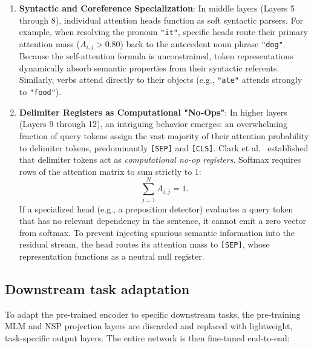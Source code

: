 \documentclass[../../../main.tex]{subfiles}
\begin{document}
\begin{enumerate}
    \item \textbf{Syntactic and Coreference Specialization}: In middle layers (Layers 5 through 8), individual attention heads function as soft syntactic parsers. For example, when resolving the pronoun \texttt{"it"}, specific heads route their primary attention mass ($A_{i,j} > 0.80$) back to the antecedent noun phrase \texttt{"dog"}. Because the self-attention formula is unconstrained, token representations dynamically absorb semantic properties from their syntactic referents. Similarly, verbs attend directly to their objects (e.g., \texttt{"ate"} attends strongly to \texttt{"food"}).
    
    \item \textbf{Delimiter Registers as Computational "No-Ops"}: In higher layers (Layers 9 through 12), an intriguing behavior emerges: an overwhelming fraction of query tokens assign the vast majority of their attention probability to delimiter tokens, predominantly \texttt{[SEP]} and \texttt{[CLS]}. Clark et al.~\cite{clark2019what} established that delimiter tokens act as \emph{computational no-op registers}. Softmax requires rows of the attention matrix to sum strictly to 1:
    \begin{equation}
    \sum_{j=1}^N A_{i,j} = 1.
    \label{eq:softmax_row_sum_one}
    \end{equation}
    If a specialized head (e.g., a preposition detector) evaluates a query token that has no relevant dependency in the sentence, it cannot emit a zero vector from softmax. To prevent injecting spurious semantic information into the residual stream, the head routes its attention mass to \texttt{[SEP]}, whose representation functions as a neutral null register.
\end{enumerate}


\subsection{Downstream task adaptation}
\label{subsec:bert_downstream_finetuning}

To adapt the pre-trained encoder to specific downstream tasks, the pre-training MLM and NSP projection layers are discarded and replaced with lightweight, task-specific output layers. The entire network is then fine-tuned end-to-end:
\end{document}
